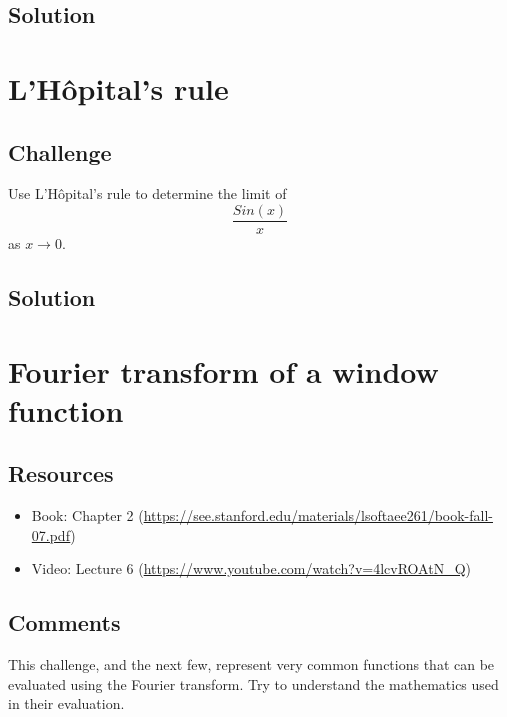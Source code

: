 \subsection*{Solution}

\timebox




\newpage
\section{L'H\^opital's rule}

\subsection*{Challenge}
Use L'H\^opital's rule to determine the limit of
\begin{equation}
    \frac{Sin(x)}{x}
\end{equation}
as $x \rightarrow 0$.

\subsection*{Solution}

\timebox




\newpage
\section{Fourier transform of a window function}
\label{sec:tophat}

\subsection*{Resources}
\begin{itemize}
    \item Book: Chapter 2 (\url{https://see.stanford.edu/materials/lsoftaee261/book-fall-07.pdf})
    \item Video: Lecture 6 (\url{https://www.youtube.com/watch?v=4lcvROAtN_Q})
\end{itemize}

\subsection*{Comments}
This challenge, and the next few, represent very common functions that can be evaluated using the Fourier transform. Try to understand the mathematics used in their evaluation.

